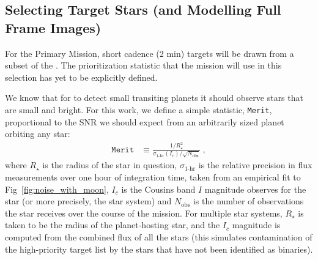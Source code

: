 \subsection{Selecting Target Stars (and Modelling Full Frame Images)}
\label{sec:selection_criteria}
For the Primary Mission, \tesss short cadence (2 min) targets will be drawn from a subset of the \tic. 
The prioritization statistic that the mission will use in this selection has yet to be explicitly defined.

We know that for \tess to detect small transiting planets
it should observe stars that are small and bright.  For this work, we
define a simple statistic, \texttt{Merit}, proportional to the SNR we
should expect from an arbitrarily sized planet orbiting any star:
\begin{align}
\texttt{Merit} &\equiv 
	\frac{1/R_\star^2}{\sigma_\text{1-hr}(I_c)/\sqrt{N_\text{obs}}}\ ,
\label{eq:merit}
\end{align}
where $R_\star$ is the radius of the star in question,
$\sigma_\text{1-hr}$ is the relative precision in flux measurements
over one hour of integration time, taken from an empirical fit to
Fig~\ref{fig:noise_with_moon}, $I_c$ is the Cousins band $I$ magnitude
\tess observes for the star (or more precisely, the star system) and
$N_\text{obs}$ is the number of observations the star receives over
the course of the mission.  For multiple star systems, $R_\star$ is
taken to be the radius of
the planet-hosting star, and the $I_c$ magnitude is computed from the 
combined flux of all the stars (this simulates contamination of the 
high-priority target list by the stars that have not been identified
as binaries).

